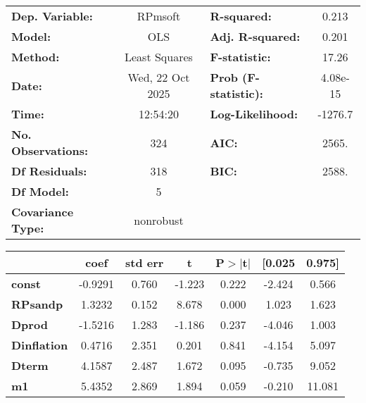 \begin{center}
\begin{tabular}{lclc}
\toprule
\textbf{Dep. Variable:}    &     RPmsoft      & \textbf{  R-squared:         } &     0.213   \\
\textbf{Model:}            &       OLS        & \textbf{  Adj. R-squared:    } &     0.201   \\
\textbf{Method:}           &  Least Squares   & \textbf{  F-statistic:       } &     17.26   \\
\textbf{Date:}             & Wed, 22 Oct 2025 & \textbf{  Prob (F-statistic):} &  4.08e-15   \\
\textbf{Time:}             &     12:54:20     & \textbf{  Log-Likelihood:    } &   -1276.7   \\
\textbf{No. Observations:} &         324      & \textbf{  AIC:               } &     2565.   \\
\textbf{Df Residuals:}     &         318      & \textbf{  BIC:               } &     2588.   \\
\textbf{Df Model:}         &           5      & \textbf{                     } &             \\
\textbf{Covariance Type:}  &    nonrobust     & \textbf{                     } &             \\
\bottomrule
\end{tabular}
\begin{tabular}{lcccccc}
                    & \textbf{coef} & \textbf{std err} & \textbf{t} & \textbf{P$> |$t$|$} & \textbf{[0.025} & \textbf{0.975]}  \\
\midrule
\textbf{const}      &      -0.9291  &        0.760     &    -1.223  &         0.222        &       -2.424    &        0.566     \\
\textbf{RPsandp}    &       1.3232  &        0.152     &     8.678  &         0.000        &        1.023    &        1.623     \\
\textbf{Dprod}      &      -1.5216  &        1.283     &    -1.186  &         0.237        &       -4.046    &        1.003     \\
\textbf{Dinflation} &       0.4716  &        2.351     &     0.201  &         0.841        &       -4.154    &        5.097     \\
\textbf{Dterm}      &       4.1587  &        2.487     &     1.672  &         0.095        &       -0.735    &        9.052     \\
\textbf{m1}         &       5.4352  &        2.869     &     1.894  &         0.059        &       -0.210    &       11.081     \\

\end{tabular}
\end{center}
